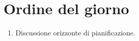 \section{Ordine del giorno}

\begin{enumerate}
    \item Discussione orizzonte di pianificazione.
\end{enumerate}